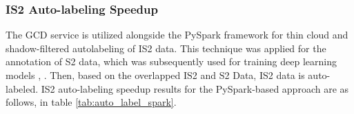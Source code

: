 \subsubsection{IS2 Auto-labeling Speedup}
The GCD service is utilized alongside the PySpark framework for thin cloud and shadow-filtered autolabeling of IS2 data. 
This technique was applied for the annotation of S2 data, which was subsequently used for training deep learning models \cite{iqrah2023toward}, \cite{iqrah2024parallel}. Then, based on the overlapped IS2 and S2 Data, IS2 data is auto-labeled. 
IS2 auto-labeling speedup results for the PySpark-based approach are as follows, in table \ref{tab:auto_label_spark}.

